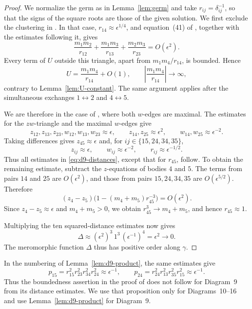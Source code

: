 \documentclass[11pt]{amsart}
\theoremstyle{definition}
\theoremstyle{remark}
\begin{document}
{\begin{proof}
We normalize the germ as in Lemma~\ref{lem:germ} and take $r_{ij}=\delta_{ij}^{-1}$,
so that the signs of the square roots are those of the given solution.
We first exclude the clustering in \cite[\S8.9.1]{AK}.  In that case,
$r_{14}\approx\epsilon^{1/4}$, and equation~(41) of \cite{AK}, together with the
estimates following it, gives
\[
 \frac{m_1m_2}{r_{12}}+\frac{m_1m_3}{r_{13}}+
 \frac{m_2m_3}{r_{23}}=O(\epsilon^2).
\]
Every term of $U$ outside this triangle, apart from $m_1m_4/r_{14}$, is bounded.  Hence
\[
 U=\frac{m_1m_4}{r_{14}}+O(1),\qquad
 \left|\frac{m_1m_4}{r_{14}}\right|\longrightarrow\infty,
\]
contrary to Lemma~\ref{lem:U-constant}.  The same argument applies after the
simultaneous exchanges $1\leftrightarrow2$ and $4\leftrightarrow5$.

We are therefore in the case of \cite[\S8.9.2]{AK}, where both $w$-edges are
maximal.  The estimates for the $zw$-triangle and the maximal $w$-edges give
\[
 z_{12},z_{13},z_{23},w_{12},w_{13},w_{23}\approx\epsilon,
 \qquad z_{14},z_{25}\approx\epsilon^2,
 \qquad w_{14},w_{25}\approx\epsilon^{-2}.
\]
Taking differences gives $z_{45}\approx\epsilon$ and, for
$ij\in\{15,24,34,35\}$,
\[
 z_{ij}\approx\epsilon,\qquad w_{ij}\approx\epsilon^{-2},
 \qquad r_{ij}\approx\epsilon^{-1/2}.
\]
Thus all estimates in \eqref{eq:d9-distances}, except that for $r_{45}$, follow.
To obtain the remaining estimate, subtract the $z$-equations of bodies $4$ and $5$.
The terms from pairs $14$ and $25$ are $O(\epsilon^2)$, and those from pairs
$15,24,34,35$ are $O(\epsilon^{5/2})$.  Therefore
\[
 (z_4-z_5)\bigl(1-(m_4+m_5)r_{45}^{-3}\bigr)=O(\epsilon^2).
\]
Since $z_4-z_5\approx\epsilon$ and $m_4+m_5>0$, we obtain
$r_{45}^3\to m_4+m_5$, and hence $r_{45}\approx1$.

Multiplying the ten squared-distance estimates now gives
\[
 \Delta\approx(\epsilon^2)^3\,1^3\,(\epsilon^{-1})^4
 =\epsilon^2\longrightarrow0.
\]
The meromorphic function $\Delta$ thus has positive order along $\gamma$.
\end{proof}

In the numbering of Lemma~\ref{lem:d9-product}, the same estimates give
\[
 p_{15}=r_{15}^2r_{23}^2r_{34}^2r_{24}^2\approx\epsilon^{-1},\qquad
 p_{24}=r_{24}^2r_{13}^2r_{35}^2r_{15}^2\approx\epsilon^{-1}.
\]
Thus the boundedness assertion in the proof of \cite[Prop.~8]{AK} does not follow
for Diagram~9 from its distance estimates.  We use that proposition only for
Diagrams~10--16 and use Lemma~\ref{lem:d9-product} for Diagram~9.

}
\end{document}
